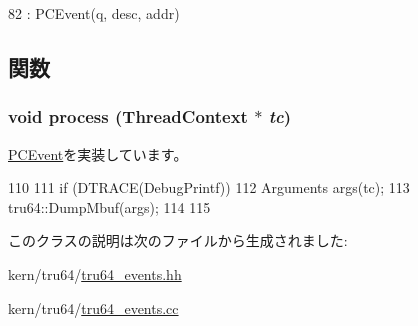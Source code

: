 \begin{DoxyCode}
82         : PCEvent(q, desc, addr) {}
\end{DoxyCode}


\subsection{関数}
\hypertarget{classDumpMbufEvent_ad66a9d5ec7cfe597b848a17c0df5cc28}{
\subsubsection[{process}]{\setlength{\rightskip}{0pt plus 5cm}void process ({\bf ThreadContext} $\ast$ {\em tc})}}
\label{classDumpMbufEvent_ad66a9d5ec7cfe597b848a17c0df5cc28}


\hyperlink{classPCEvent_af6ff225900b7b98c08880da7225b38f0}{PCEvent}を実装しています。


\begin{DoxyCode}
110 {
111     if (DTRACE(DebugPrintf)) {
112         Arguments args(tc);
113         tru64::DumpMbuf(args);
114     }
115 }
\end{DoxyCode}


このクラスの説明は次のファイルから生成されました:\begin{DoxyCompactItemize}
\item 
kern/tru64/\hyperlink{tru64__events_8hh}{tru64\_\-events.hh}\item 
kern/tru64/\hyperlink{tru64__events_8cc}{tru64\_\-events.cc}\end{DoxyCompactItemize}
